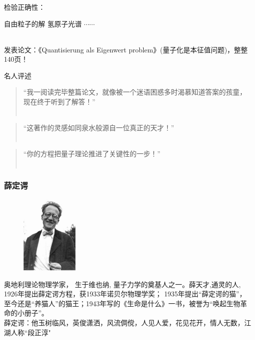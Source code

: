 \begin{frame}
    \frametitle{}
    检验正确性：
    \begin{enumerate}
        \Item 自由粒子的解
        \Item 氢原子光谱
        \Item $\cdots \cdots$
    \end{enumerate}
    ~\\ 
    发表论文：《Quantisierung als Eigenwert problem》(量子化是本征值问题)，整整140页！
\end{frame}

\begin{frame}{名人评述}
    \begin{enumerate}
        \Item 
        \begin{quote}
            “我一阅读完毕整篇论文，就像被一个迷语困惑多时渴慕知道答案的孩童，现在终于听到了解答！” \\
            ~~\\
        \end{quote}  
        \Item 
        \begin{quote}
            “这著作的灵感如同泉水般源自一位真正的天才！” \\
            ~~\\
        \end{quote}  
        \Item  
        \begin{quote}
            “你的方程把量子理论推进了关键性的一步！” \\
            ~~\\
        \end{quote} 
    \end{enumerate}
\end{frame}

\begin{frame}
    \frametitle{薛定谔}
    \begin{figure} %
        \includegraphics[width=0.25\textwidth]{figs/schroginger.png}   
    \end{figure}
奥地利理论物理学家， 生于维也纳, 量子力学的奠基人之一。薛天才,通灵的人, 1926年提出薛定谔方程，获1933年诺贝尔物理学奖； 1935年提出“薛定谔的猫”，至今还是“养猫人”的猫王；1943年写的《生命是什么》一书，被誉为“唤起生物革命的小册子”。\\ \vspace{0.3em}
薛定谔：他玉树临风，英俊潇洒，风流倜傥，人见人爱，花见花开，情人无数，江湖人称“段正淳"
\end{frame}

